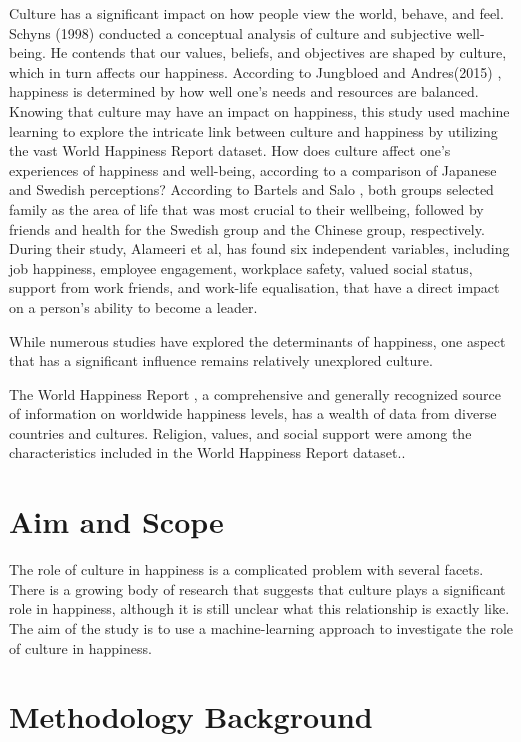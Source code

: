 \documentclass[12pt, a4paper, twoside]{report}
\theoremstyle{plain} %
\theoremstyle{definition} %
\theoremstyle{remark} %
\numberwithin{equation}{chapter}
\begin{document}
Culture has a significant impact on how people view the world, behave, and feel. Schyns (1998) \cite{schyns1998culture} conducted a conceptual analysis of culture and subjective well-being. He contends that our values, beliefs, and objectives are shaped by culture, which in turn affects our happiness. According to Jungbloed and Andres(2015) \cite{jongbloed2015happiness}, happiness is determined by how well one's needs and resources are balanced. Knowing that culture may have an impact on happiness, this study used machine learning to explore the intricate link between culture and happiness by utilizing the vast World Happiness Report dataset.
How does culture affect one's experiences of happiness and well-being, according to a comparison of Japanese and Swedish perceptions? According to Bartels and Salo \cite{bartels2018does}, both groups selected family as the area of life that was most crucial to their wellbeing, followed by friends and health for the Swedish group and the Chinese group, respectively.
During their study, Alameeri et al, \cite{alameeri2021effect} has found six independent variables, including job happiness, employee engagement, workplace safety, valued social status, support from work friends, and work-life equalisation, that have a direct impact on a person's ability to become a leader.

While numerous studies have explored the determinants of happiness, one aspect that has a significant influence remains relatively unexplored culture.

The World Happiness Report \cite{worldhappinessreport2023}, a comprehensive and generally recognized source of information on worldwide happiness levels, has a wealth of data from diverse countries and cultures. Religion, values, and social support were among the characteristics included in the World Happiness Report dataset.\cite{diener2009well}. 

\section{Aim and Scope}
The role of culture in happiness is a complicated problem with several facets. There is a growing body of research that suggests that culture plays a significant role in happiness, although it is still unclear what this relationship is exactly like.
The aim of the study is to use a machine-learning approach to investigate the role of culture in happiness. 

\section{Methodology Background}
\end{document}
